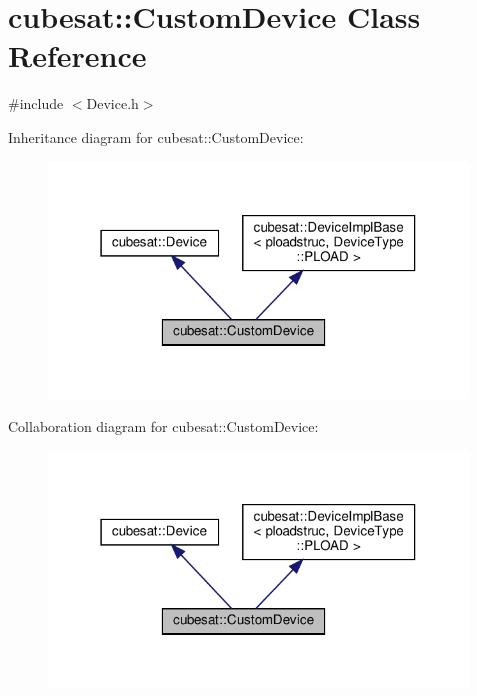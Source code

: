 \hypertarget{classcubesat_1_1CustomDevice}{}\section{cubesat\+:\+:Custom\+Device Class Reference}
\label{classcubesat_1_1CustomDevice}


{\ttfamily \#include $<$Device.\+h$>$}



Inheritance diagram for cubesat\+:\+:Custom\+Device\+:
\nopagebreak
\begin{figure}[H]
\begin{center}
\leavevmode
\includegraphics[width=316pt]{classcubesat_1_1CustomDevice__inherit__graph}
\end{center}
\end{figure}


Collaboration diagram for cubesat\+:\+:Custom\+Device\+:
\nopagebreak
\begin{figure}[H]
\begin{center}
\leavevmode
\includegraphics[width=316pt]{classcubesat_1_1CustomDevice__coll__graph}
\end{center}
\end{figure}
